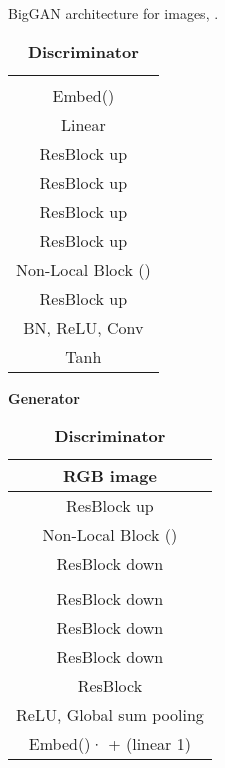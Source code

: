 \documentclass{article}
\begin{document}
\begin{table}[!htbp]
    \centering
    \caption{BigGAN architecture for  images, .}
    \vspace{0.1in}
    \begin{subtable}{.8\linewidth}
        \centering
        \begin{tabular}{c}
            \toprule
             \\
            Embed()  \\\midrule
            Linear \\ \midrule
            ResBlock up  \\ \midrule
            ResBlock up  \\ \midrule
            ResBlock up  \\ \midrule
            ResBlock up  \\ \midrule
            Non-Local Block () \\ \midrule
            ResBlock up  \\ \midrule
            BN, ReLU,  Conv  \\ \midrule
            Tanh \\ \bottomrule
        \end{tabular}
        \caption{\bf Generator}
    \end{subtable}\vspace{5mm}
    \begin{subtable}{.8\linewidth}
        \centering
        \begin{tabular}{c}
            \toprule
            RGB image  \\ \midrule
            ResBlock up  \\ \midrule
            Non-Local Block () \\ \midrule
            ResBlock down  \\ \midrule
            \textcolor{blue}{} \\ \midrule
            ResBlock down  \\ \midrule
            ResBlock down  \\ \midrule
            ResBlock down  \\ \midrule
            ResBlock  \\ \midrule
            ReLU, Global sum pooling \\ \midrule
            Embed()· + (linear  1) \\ \bottomrule
        \end{tabular}
        \caption{\bf Discriminator}
    \end{subtable}\label{tab:arch_imagenet}
    \end{table}
    
\end{document}
